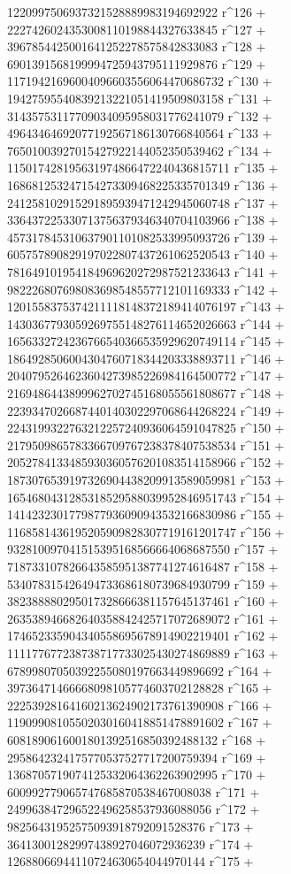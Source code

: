        1220997506937321528889983194692922 r^126 + 
       2227426024353008110198844327633845 r^127 + 
       3967854425001641252278575842833083 r^128 + 
       6901391568199994725943795111929876 r^129 + 
       11719421696004096603556064470686732 r^130 + 
       19427595540839213221051419509803158 r^131 + 
       31435753117709034095958031776241079 r^132 + 
       49643464692077192567186130766840564 r^133 + 
       76501003927015427922144052350539462 r^134 + 
       115017428195631974866472240436815711 r^135 + 
       168681253247154273309468225335701349 r^136 + 
       241258102915291895939471242945060748 r^137 + 
       336437225330713756379346340704103966 r^138 + 
       457317845310637901101082533995093726 r^139 + 
       605757890829197022807437261062520543 r^140 + 
       781649101954184969620272987521233643 r^141 + 
       982226807698083698548557712101169333 r^142 + 
       1201558375374211118148372189414076197 r^143 + 
       1430367793059269755148276114652026663 r^144 + 
       1656332724236766540366535929620749114 r^145 + 
       1864928506004304760718344203338893711 r^146 + 
       2040795264623604273985226984164500772 r^147 + 
       2169486443899962702745168055561808677 r^148 + 
       2239347026687440140302297068644268224 r^149 + 
       2243199322763212257240936064591047825 r^150 + 
       2179509865783366709767238378407538534 r^151 + 
       2052784133485930360576201083514158966 r^152 + 
       1873076539197326904438209913589059981 r^153 + 
       1654680431285318529588039952846951743 r^154 + 
       1414232301779877936090943532166830986 r^155 + 
       1168581436195205909828307719161201747 r^156 + 
       932810097041515395168566664068687550 r^157 + 
       718733107826643585951387741274616487 r^158 + 
       534078315426494733686180739684930799 r^159 + 
       382388880295017328666381157645137461 r^160 + 
       263538946682640358842425717072689072 r^161 + 
       174652335904340558695678914902219401 r^162 + 
       111177677238738717733025430274869889 r^163 + 
       67899807050392255080197663449896692 r^164 + 
       39736471466668098105774603702128828 r^165 + 
       22253928164160213624902173761390908 r^166 + 
       11909908105502030160418851478891602 r^167 + 
       6081890616001801392516850392488132 r^168 + 
       2958642324175770537527717200759394 r^169 + 
       1368705719074125332064362263902995 r^170 + 
       600992779065747685870538467008038 r^171 + 
       249963847296522496258537936088056 r^172 + 
       98256431952575093918792091528376 r^173 + 
       36413001282997438927046072936239 r^174 + 
       12688066944110724630654044970144 r^175 + 

